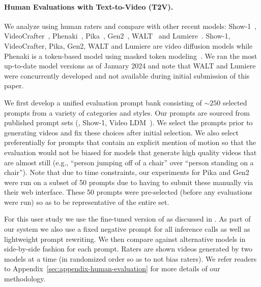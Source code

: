 \vspace{-4mm}
\paragraph{Human Evaluations with Text-to-Video (T2V).}
We analyze \modelname{} using human raters and compare with other recent
models: Show-1~\cite{zhang2023show},
VideoCrafter~\cite{chen2023videocrafter1}, Phenaki~\cite{villegas2022phenaki},  Pika~\cite{pika2023},  Gen2~\cite{runway2023}, WALT~\cite{gupta2023photorealistic}
and Lumiere~\cite{bar2024lumiere}.
Show-1, VideoCrafter, Pika, Gen2, WALT 
and Lumiere are video diffusion models
while Phenaki is a token-based model using  masked token modeling~\cite{chang2022maskgit}.
We ran the most up-to-date model versions as of January 2024
and note that WALT and Lumiere were concurrently developed
and not available during initial submission of this paper.

We first develop a unified evaluation prompt bank consisting of $\sim 250$
selected prompts from a variety of categories and styles.
%
Our prompts are
sourced from published prompt sets 
(\eg, Show-1, Video LDM~\cite{blattmann2023align}).
%
We select the prompts prior to generating videos
and fix these choices after initial selection. 
%
We also select preferentially for prompts that contain an explicit mention of motion so that the evaluation would not be biased for models that generate high quality videos that are almost still (e.g., ``person jumping off of a chair'' over ``person standing on a chair''). 
Note that due to time constraints, 
our experiments for Pika and Gen2 were run on a subset of
50 prompts due to having to submit these manually via their web
interface.  These 50 prompts were pre-selected (before any evaluations 
were run) so as to be representative of the entire set.
%


For this user study we use the fine-tuned version of \modelname{} as discussed in .
As part of our system we also use a fixed
negative prompt for all inference calls
as well as lightweight prompt rewriting.
We then compare \modelname{} against alternative models
in side-by-side fashion for each prompt. Raters are shown videos generated by two models at a time (in randomized order so as to not bias raters). We refer readers to 
Appendix~\ref{sec:appendix-human-evaluation}
for more details of our methodology.

